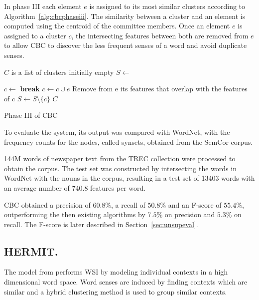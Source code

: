 In phase III each element $e$ is assigned to its most similar clusters
according to Algorithm~\ref{alg:cbcphaseiii}. The similarity between a cluster
and an element is computed using the centroid of the committee members. Once an
element $e$ is assigned to a cluster $c$, the intersecting features between
both are removed from $e$ to allow \ac{CBC} to discover the less frequent
senses of a word and avoid duplicate senses.

\begin{algorithm}
 \begin{algorithmic}
  \State $C$ is a list of clusters initially empty
    \State $S \gets$ 

      \State $c \gets$ 
        \State \textbf{break}
      \EndIf
       \State $c \gets c \cup e$
       \State Remove from e its features that overlap with the features of c
     \EndIf
     \State $S \gets S \setminus \{c\}$
    \EndWhile
    \State \Return $C$
  \EndFunction
 \end{algorithmic}

 \caption{\label{alg:cbcphaseiii} Phase III of CBC}
\end{algorithm}

To evaluate the system, its output was compared with WordNet, with the
frequency counts for the nodes, called synsets, obtained from the SemCor corpus.

144M words of newspaper text from the TREC collection were processed to obtain
the corpus. The test set was constructed by intersecting the words in
WordNet with the nouns in the corpus, resulting in a test set of 13403 words
with an average number of 740.8 features per word.

\ac{CBC} obtained a precision of $60.8\%$, a recall of $50.8\%$ and an
F-score of $55.4\%$, outperforming the then existing algorithms by $7.5\%$ on
precision and $5.3\%$ on recall. The F-score is later described in
Section~\ref{sec:unsupeval}.

\subsection{HERMIT.}

The model from \cite{jurgens2010hermit} performs \ac{WSI} by modeling individual
contexts in a high dimensional word space. Word senses are induced by finding
contexts which are similar and a hybrid clustering method is used to group
similar contexts.

